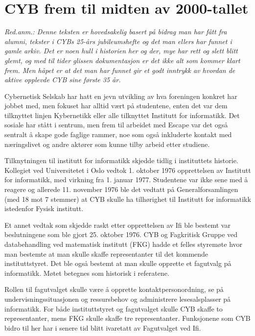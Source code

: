 \chapter[CYB tidlig historie]{CYB frem til midten av 2000-tallet}

\textit{Red.anm.: Denne teksten er hovedsakelig basert på bidrag man har fått fra alumni, tekster i CYBs 25-års jubileumshefte og det man ellers har funnet i gamle arkiv. Det er noen hull i historien her og der, mye har rett og slett blitt glemt, og med til tider glissen dokumentasjon er det ikke alt som kommer klart frem. Men håpet er at det man har funnet gir et godt inntrykk av hvordan de aktive opplevde CYB sine første 35 år.}

\author{Skrevet av Arne Hassel}

Cybernetisk Selskab har hatt en jevn utvikling av hva foreningen konkret har jobbet med, men fokuset har alltid vært på studentene, enten det var dem tilknyttet linjen Kybernetikk eller alle tilknyttet Institutt for informatikk. Det sosiale har stått i sentrum, men frem til arbeidet med Escape var det også sentralt å skape gode faglige rammer, noe som også inkluderte kontakt med næringslivet og andre aktører som kunne tilby arbeid etter studiene. 

Tilknytningen til institutt for informatikk skjedde tidlig i instituttets historie. Kollegiet ved Universitetet i Oslo vedtok 1. oktober 1976 opprettelsen av Institutt for informatikk, med virkning fra 1. januar 1977. Studentene var ikke sene med å reagere og allerede 11. november 1976 ble det vedtatt på Generalforsamlingen (med 18 mot 7 stemmer) at CYB skulle ha tilhørighet til Institutt for informatikk istedenfor Fysisk institutt.

Et annet vedtak som skjedde raskt etter opprettelsen av Ifi ble bestemt var beslutningene som ble gjort 25. oktober 1976. CYB og Fagkritisk Gruppe ved databehandling ved matematisk institutt (FKG) hadde et felles styremøte hvor man bestemte at man skulle skaffe representanter til det kommende instituttstyret. Det ble også bestemt at man skulle opprette et fagutvalg på informatikk. Møtet betegnes som historisk i referatene. 

Rollen til fagutvalget skulle være å opprette kontaktpersonordning, se på undervisningssituasjonen og ressursbehov og administrere lesesalsplasser på informatikk. For både instituttstyret og fagutvalget skulle CYB skaffe to representanter, mens FKG skulle skaffe tre representanter. Funksjonene som CYB bidro til her har i senere tid blitt ivaretatt av Fagutvalget ved Ifi.

